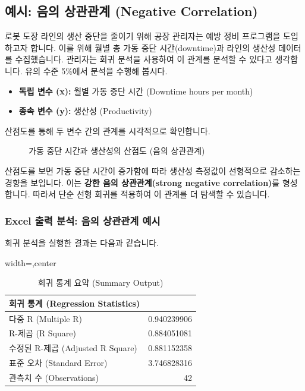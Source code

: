 \documentclass[11pt,a4paper]{article}
\theoremstyle{definition}
\begin{document}
\newpage
\subsection{예시: 음의 상관관계 (Negative Correlation)}
로봇 도장 라인의 생산 중단을 줄이기 위해 공장 관리자는 예방 정비 프로그램을 도입하고자 합니다. 이를 위해 월별 총 가동 중단 시간(downtime)과 라인의 생산성 데이터를 수집했습니다. 관리자는 회귀 분석을 사용하여 이 관계를 분석할 수 있다고 생각합니다. 유의 수준 5\%에서 분석을 수행해 봅시다.

\begin{itemize}
    \item \textbf{독립 변수 (x):} 월별 가동 중단 시간 (Downtime hours per month)
    \item \textbf{종속 변수 (y):} 생산성 (Productivity)
\end{itemize}
산점도를 통해 두 변수 간의 관계를 시각적으로 확인합니다.

\begin{figure}[h!]
    \centering
    \caption{가동 중단 시간과 생산성의 산점도 (음의 상관관계)}
    \label{fig:negative_correlation_scatter}
\end{figure}
\begin{tcolorbox}[colback=lightblue,colframe=darkblue,title={산점도 분석: 음의 상관관계}]
산점도를 보면 가동 중단 시간이 증가함에 따라 생산성 측정값이 선형적으로 감소하는 경향을 보입니다. 이는 \textbf{강한 음의 상관관계(strong negative correlation)}를 형성합니다. 따라서 단순 선형 회귀를 적용하여 이 관계를 더 탐색할 수 있습니다.
\end{tcolorbox}

\subsubsection{Excel 출력 분석: 음의 상관관계 예시}
회귀 분석을 실행한 결과는 다음과 같습니다.

\begin{table}[h!]
    \centering
    \caption{회귀 통계 요약 (Summary Output)}
    \label{tab:regression_summary_output_negative}
    \begin{adjustbox}{width=\textwidth,center}
    \begin{tabular}{lr}
    \toprule
    \textbf{회귀 통계 (Regression Statistics)} & \\
    \midrule
    다중 R (Multiple R) & 0.940239906 \\
    R-제곱 (R Square) & 0.884051081 \\
    수정된 R-제곱 (Adjusted R Square) & 0.881152358 \\
    표준 오차 (Standard Error) & 3.746828316 \\
    관측치 수 (Observations) & 42 \\
    \bottomrule
    \end{tabular}
    \end{adjustbox}
\end{table}
\end{document}
